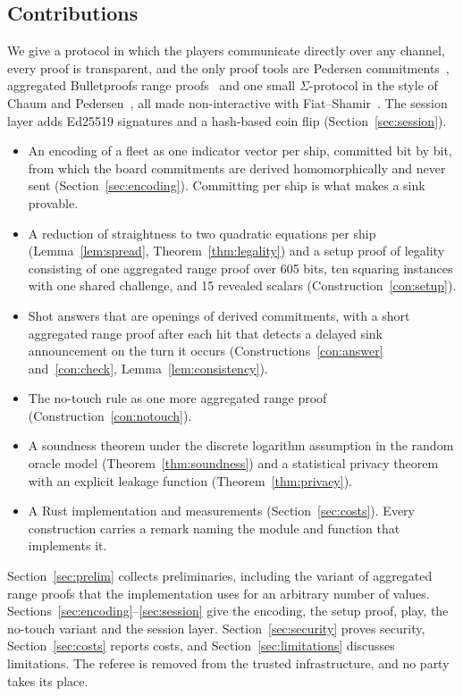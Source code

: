 \documentclass[11pt]{article}
\theoremstyle{definition}
\theoremstyle{remark}
\begin{document}
\subsection{Contributions}\label{sec:contrib}
We give a protocol in which the players communicate directly over any channel, every proof is transparent, and the only proof tools are Pedersen commitments~\cite{pedersen}, aggregated Bulletproofs range proofs~\cite{bulletproofs} and one small $\Sigma$-protocol in the style of Chaum and Pedersen~\cite{chaum-pedersen}, all made non-interactive with Fiat--Shamir~\cite{fiat-shamir}. The session layer adds Ed25519 signatures and a hash-based coin flip (Section~\ref{sec:session}).
\begin{itemize}[leftmargin=2em]
  \item An encoding of a fleet as one indicator vector per ship, committed bit by bit, from which the board commitments are derived homomorphically and never sent (Section~\ref{sec:encoding}). Committing per ship is what makes a sink provable.
  \item A reduction of straightness to two quadratic equations per ship (Lemma~\ref{lem:spread}, Theorem~\ref{thm:legality}) and a setup proof of legality consisting of one aggregated range proof over 605 bits, ten squaring instances with one shared challenge, and 15 revealed scalars (Construction~\ref{con:setup}).
  \item Shot answers that are openings of derived commitments, with a short aggregated range proof after each hit that detects a delayed sink announcement on the turn it occurs (Constructions~\ref{con:answer} and~\ref{con:check}, Lemma~\ref{lem:consistency}).
  \item The no-touch rule as one more aggregated range proof (Construction~\ref{con:notouch}).
  \item A soundness theorem under the discrete logarithm assumption in the random oracle model (Theorem~\ref{thm:soundness}) and a statistical privacy theorem with an explicit leakage function (Theorem~\ref{thm:privacy}).
  \item A Rust implementation and measurements (Section~\ref{sec:costs}). Every construction carries a remark naming the module and function that implements it.
\end{itemize}
Section~\ref{sec:prelim} collects preliminaries, including the variant of aggregated range proofs that the implementation uses for an arbitrary number of values. Sections~\ref{sec:encoding}--\ref{sec:session} give the encoding, the setup proof, play, the no-touch variant and the session layer. Section~\ref{sec:security} proves security, Section~\ref{sec:costs} reports costs, and Section~\ref{sec:limitations} discusses limitations. The referee is removed from the trusted infrastructure, and no party takes its place.
\end{document}

